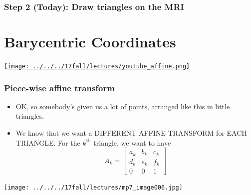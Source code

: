 \documentclass{beamer}
\begin{document}
\begin{frame}
  \frametitle{Step 2 (Today): Draw triangles on the MRI}
  \centerline{}
\end{frame}

\section{Barycentric Coordinates}
\setcounter{subsection}{1}

\begin{frame}
  \centerline{\href{https://www.youtube.com/watch?v=il6Z5LCykZk}{\texttt{[image: ../../../17fall/lectures/youtube\_affine.png]}}}
\end{frame}

\begin{frame}
  \frametitle{Piece-wise affine transform}
  \begin{itemize}
    \item OK, so somebody's given us a lot of points, arranged like
      this in little triangles.
    \item We know that we want a DIFFERENT AFFINE TRANSFORM for EACH
      TRIANGLE.  For the $k^{\textrm{th}}$ triangle, we want to have
      \[
      A_k = \left[\begin{array}{ccc}a_k&b_k&c_k\\d_k&e_k&f_k\\0&0&1\end{array}\right]
      \]
  \end{itemize}
  \centerline{\texttt{[image: ../../../17fall/lectures/mp7\_image006.jpg]}}
\end{frame}
\end{document}
